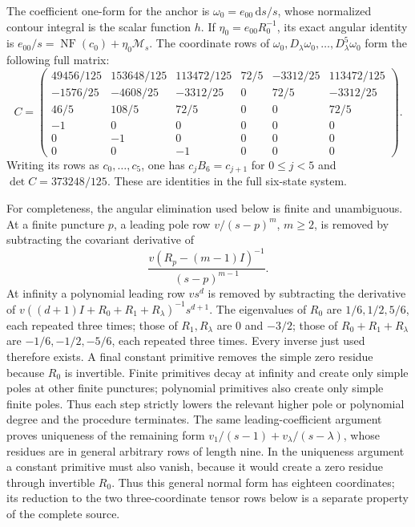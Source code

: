 \documentclass[11pt,a4paper]{article}
\newcommand{\dd}{\mathrm d}
\begin{document}
The coefficient one-form for the anchor is \(\omega_0=e_{00}\,\dd s/s\),
whose normalized contour integral is the scalar function \(h\).  If
\(\eta_0=e_{00}R_0^{-1}\), its exact angular identity is
\(e_{00}/s=\operatorname{NF}(c_0)+\eta_0\mathcal M_s\).  The coordinate rows of
\(\omega_0,D_\lambda\omega_0,\ldots,D_\lambda^5\omega_0\) form the following full matrix:
\begin{equation}\label{eq:appendix-C}
 C=\begin{pmatrix}
 49456/125&153648/125&113472/125&72/5&-3312/25&113472/125\\
 -1576/25&-4608/25&-3312/25&0&72/5&-3312/25\\
 46/5&108/5&72/5&0&0&72/5\\
 -1&0&0&0&0&0\\0&-1&0&0&0&0\\0&0&-1&0&0&0
 \end{pmatrix}.
\end{equation}
Writing its rows as \(c_0,\ldots,c_5\), one has
\(c_jB_6=c_{j+1}\) for \(0\le j<5\) and
\(\det C=373248/125\).  These are identities in the full six-state
system.

For completeness, the angular elimination used below is finite and
unambiguous.  At a finite puncture \(p\), a leading pole row
\(v/(s-p)^m\), \(m\ge2\), is removed by subtracting the covariant
derivative of
\[
 \frac{v(R_p-(m-1)I)^{-1}}{(s-p)^{m-1}}.
\]
At infinity a polynomial leading row \(v s^d\) is removed by subtracting
the derivative of
\(v((d+1)I+R_0+R_1+R_\lambda)^{-1}s^{d+1}\).
The eigenvalues of \(R_0\) are \(1/6,1/2,5/6\), each repeated three
times; those of \(R_1,R_\lambda\) are \(0\) and \(-3/2\);
those of \(R_0+R_1+R_\lambda\) are
\(-1/6,-1/2,-5/6\), each repeated three times.  Every inverse just used
therefore exists.  A final constant primitive removes the simple zero
residue because \(R_0\) is invertible.  Finite primitives decay at
infinity and create only simple poles at other finite punctures;
polynomial primitives also create only simple finite poles.  Thus each
step strictly lowers the relevant higher pole or polynomial degree and
the procedure terminates.  The same leading-coefficient argument proves
uniqueness of the remaining form
\(v_1/(s-1)+v_\lambda/(s-\lambda)\), whose residues are in general
arbitrary rows of length nine. In the uniqueness argument a constant
primitive must also vanish, because it would create a zero residue through
invertible $R_0$. Thus this general normal form has eighteen coordinates;
its reduction to the two three-coordinate tensor rows below is a separate
property of the complete source.
\end{document}
